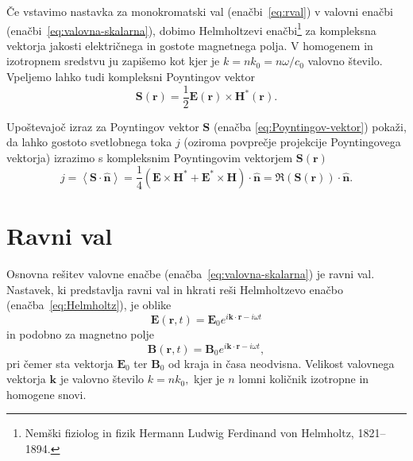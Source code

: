 Če vstavimo nastavka za monokromatski val (enačbi~\ref{eq:rval}) v valovni enačbi
(enačbi~\ref{eq:valovna-skalarna}), dobimo Helmholtzevi
enačbi\footnote{Nemški fiziolog in fizik Hermann Ludwig Ferdinand von Helmholtz, 1821--1894.} 
za kompleksna vektorja jakosti električnega in gostote magnetnega polja.
V homogenem in izotropnem sredstvu ju zapišemo kot
kjer je $k=nk_{0}=n\omega/c_{0}$ valovno število. 
Vpeljemo lahko tudi kompleksni Poyntingov vektor
\begin{equation}
\mathbf{S}(\mathbf{r})=\frac{1}{2}\mathbf{E}(\mathbf{r})\times\mathbf{H}^{*}(\mathbf{r}).
\label{eq:Poyntingov-vektor-c}
\end{equation}
\begin{definition}
Upoštevajoč izraz za Poyntingov vektor $\mathbf{S}$
(enačba \ref{eq:Poyntingov-vektor}) pokaži, da lahko gostoto svetlobnega toka $j$
(oziroma povprečje projekcije Poyntingovega vektorja)
 izrazimo
s kompleksnim Poyntingovim vektorjem $\mathbf{S}(\mathbf{r})$
\begin{equation}
\label{eq:jReS}
j=\left\langle \mathbf{\mathbf{S}}\cdot\mathbf{\hat{n}}\right\rangle =
\frac{1}{4}\left(\mathbf{E}\times\mathbf{H}^{*}+\mathbf{E}^{*}\times\mathbf{H}\right)\cdot\mathbf{\hat{n}}=\Re(\mathbf{S}
(\mathbf{r}))\cdot\mathbf{\hat{n}}.
\end{equation}
\end{definition}

\section{Ravni val}
Osnovna rešitev valovne enačbe (enačba~\ref{eq:valovna-skalarna}) je ravni 
val. Nastavek, ki predstavlja ravni val in hkrati reši 
Helmholtzevo enačbo (enačba~\ref{eq:Helmholtz}), je oblike
\begin{equation}
\mathbf{E}(\mathbf{r},t) =
\mathbf{E}_{0}e^{i\mathbf{k}\cdot\mathbf{r}-i \omega t}
\end{equation}
in podobno za magnetno polje
\begin{equation}
 \mathbf{B}(\mathbf{r},t) =
\mathbf{B}_{0}e^{i\mathbf{k}\cdot\mathbf{r}-i \omega t},
\end{equation}
pri čemer sta vektorja $\mathbf{E}_{0}$ ter $\mathbf{B}_{0}$ od kraja in časa neodvisna. 
Velikost valovnega vektorja $\mathbf{k}$ je valovno število $k=nk_{0},$ 
kjer je $n$ lomni količnik izotropne in homogene snovi. 

